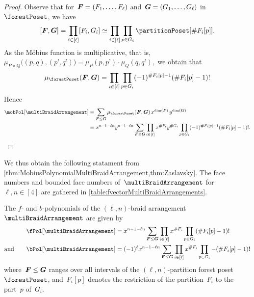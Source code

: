 \begin{proof}
Observe that for~$\boldsymbol{F} = (F_1, \dots, F_\ell)$ and~$\boldsymbol{G} = (G_1, \dots, G_\ell)$ in~$\forestPoset$, we have
\[
[\b{F}, \b{G}] = \prod_{i \in [\ell]} [F_i, G_i] \simeq \prod_{i \in [\ell]} \prod_{p \in G_i} \partitionPoset[{\#F_i[p]}].
\]
As the M\"obius function is multiplicative, that is,
\(
\mu_{P \times Q} \big( (p,q), (p’,q’) \big) = \mu_P(p,p’) \cdot \mu_Q(q,q’),
\)
we obtain that
\[
\mu_{\forestPoset}(\b{F}, \b{G}) = \prod_{i \in [\ell]} \prod_{p \in G_i} (-1)^{\#F_i[p]-1} (\# F_i[p]-1)!
\]
Hence
\begin{align*}
\mobPol[\multiBraidArrangement] 
& = \sum_{\b{F} \le \b{G}} \mu_{\forestPoset}(\b{F}, \b{G}) \, x^{\dim(\b{F})} \, y^{\dim(\b{G})} \\
& = x^{n-1-\ell n} y^{n-1-\ell n} \sum_{\b{F} \le \b{G}} \prod_{i \in [\ell]} x^{\#F_i} y^{\#G_i} \prod_{p \in G_i} (-1)^{\#F_i[p]-1} (\# F_i[p]-1)!.
\qedhere
\end{align*}
\end{proof}

We thus obtain the following statament from \cref{thm:MobiusPolynomialMultiBraidArrangement,thm:Zaslavsky}.
The face numbers and bounded face numbers of~$\multiBraidArrangement$ for~$\ell, n \in [4]$ are gathered in \cref{table:fvectorMultiBraidArrangements}.

\begin{corollary}
\label{coro:fbvectorsMultiBraidArrangement}
The $f$- and $b$-polynomials of the $(\ell,n)$-braid arrangement~$\multiBraidArrangement$ are given by
\begin{align*}
\fPol[\multiBraidArrangement] & = x^{n-1-\ell n}\sum_{\b{F} \le \b{G}} \prod_{i \in [\ell]} x^{\#F_i} \prod_{p \in G_i} (\# F_i[p]-1)!\\
\text{and}\qquad
\bPol[\multiBraidArrangement] & = (-1)^\ell x^{n-1-\ell n} \sum_{\b{F} \le \b{G}} \prod_{i \in [\ell]} x^{\#F_i} \prod_{p \in G_i} -(\# F_i[p]-1)!
\end{align*}
where~$\boldsymbol{F} \le \boldsymbol{G}$ ranges over all intervals of the $(\ell,n)$-partition forest poset~$\forestPoset$, and~$F_i[p]$ denotes the restriction of the partition~$F_i$ to the part~$p$ of~$G_i$.
\end{corollary}

